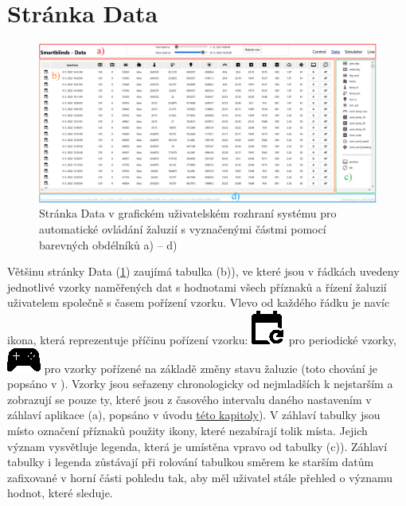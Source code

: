 \section{Stránka Data} \label{sec:data}
    \begin{figure}[h]
        \centering
        \includegraphics[draft=false,width=\textwidth]{img/gui/data.png}
        \caption[Stránka Data v GUI]{Stránka Data v grafickém uživatelském rozhraní systému pro automatické ovládání žaluzií s vyznačenými částmi pomocí barevných obdélníků \textcolor{guired}{a)} -- \textcolor{guiblue}{d)}}
        \label{fig:data}
    \end{figure}
    Většinu stránky Data (\cref{fig:data}) zaujímá tabulka (\textcolor{guiorange}{b)}), ve které jsou v řádkách uvedeny jednotlivé vzorky naměřených dat s hodnotami všech příznaků a řízení žaluzií uživatelem společně s časem pořízení vzorku. Vlevo od každého řádku je navíc ikona, která reprezentuje příčinu pořízení vzorku: \includegraphics[height=0.85\baselineskip]{img/periodic.eps} pro periodické vzorky, \includegraphics[height=0.85\baselineskip]{img/event.eps} pro vzorky pořízené na základě změny stavu žaluzie (toto chování je popsáno v ). Vzorky jsou seřazeny chronologicky od nejmladších k nejstarším a zobrazují se pouze ty, které jsou z časového intervalu daného nastavením v záhlaví aplikace (\textcolor{guired}{a)}, popsáno v úvodu \hyperref[chap:gui]{této kapitoly}). V záhlaví tabulky jsou místo označení příznaků použity ikony, které nezabírají tolik místa. Jejich význam vysvětluje legenda, která je umístěna vpravo od tabulky (\textcolor{guigreen}{c)}). Záhlaví tabulky i legenda zůstávají při rolování tabulkou směrem ke starším datům zafixované v horní části pohledu tak, aby měl uživatel stále přehled o významu hodnot, které sleduje.

